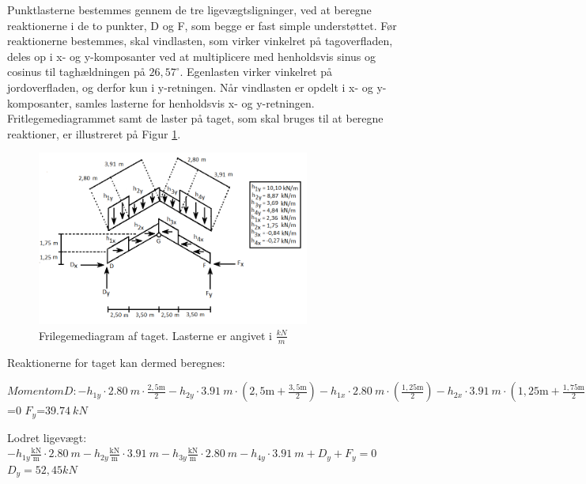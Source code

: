 Punktlasterne bestemmes gennem de tre ligevægtsligninger, ved at beregne reaktionerne i de to punkter, D og F, som begge er fast simple understøttet. Før reaktionerne bestemmes, skal vindlasten, som virker vinkelret på tagoverfladen, deles op i x- og y-komposanter ved at multiplicere med henholdsvis sinus og cosinus til taghældningen på $26,\!57^\circ$. Egenlasten virker vinkelret på jordoverfladen, og derfor kun i y-retningen. Når vindlasten er opdelt i x- og y-komposanter, samles lasterne for henholdsvis x- og y-retningen. Fritlegemediagrammet samt de laster på taget, som skal bruges til at beregne reaktioner, er illustreret på Figur \ref{fig:fld}. 

\begin{figure}[htbp]
	\centering
	\includegraphics[width=0.8\textwidth]{billeder/fldtag.png}
	\caption{Frilegemediagram af taget. Lasterne er angivet i $\frac{kN}{m}$}
	\label{fig:fld}
\end{figure}

Reaktionerne for taget kan dermed beregnes:
\begin{center}
	$Moment om D: -h_{1y} \cdot \SI{2,80}{m} \cdot \frac{2,5 \text{m}}{2} - h_{2y} \cdot \SI{3,91}{m} \cdot (2,\!5 \text{m} + \frac{3,5 \text{m}}{2}) - h_{1x} \cdot \SI{2,80}{m} \cdot (\frac{1,25 \text{m}}{2}) - h_{2x} \cdot \SI{3,91}{m} \cdot (1,\!25 \text{m} + \frac{1,\!75 \text{m}}{2}) - h_{3y} \cdot \SI{2,80}{m} \cdot (6 \text{m} + \frac{2,5 \text{m}}{2}) - h_{4y} \cdot \SI{3,91}{m} \cdot (8,\!5 \text{m} + \frac{3,5 \text{m}}{2}) - h_{3x} \cdot \SI{2,80}{m} \cdot (1,\!25 \text{m} + \frac{1,75 \text{m}}{2}) - h_{4x} \cdot \SI{3,91}{m} \cdot (\frac{1,\!25 \text{m}}{2}) + \SI{12}{m} \cdot F_y $=$ 0$ 
	\newline
	$F_y $=$ \SI{39,74}{kN}$
\end{center}

\begin{center}
	Lodret ligevægt: $-h_{1y} \frac{\text{kN}}{\text{m}} \cdot \SI{2,80}{m} - h_{2y} \frac{\text{kN}}{\text{m}} \cdot \SI{3,91}{m} - h_{3y} \frac{\text{kN}}{\text{m}} \cdot \SI{2,80}{m} -  h_{4y} \cdot \SI{3,91}{m} + D_y + F_y = 0$ 
	\newline
	$D_y = 52,\!45 kN$
\end{center}

